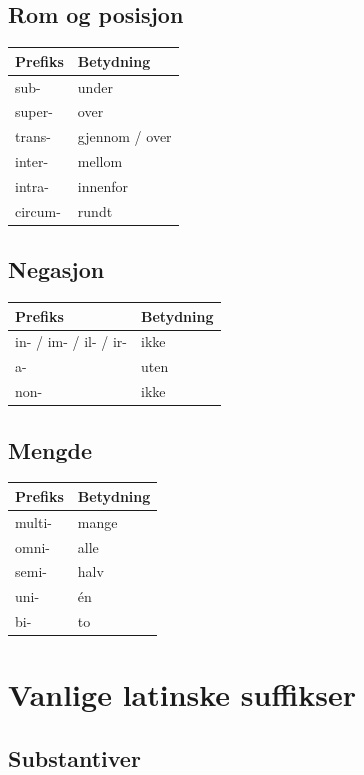 \documentclass{article}
\begin{document}
\subsection{Rom og posisjon}

\begin{tabular}{ll}
\toprule
Prefiks & Betydning \\
\midrule
sub- & under \\
super- & over \\
trans- & gjennom / over \\
inter- & mellom \\
intra- & innenfor \\
circum- & rundt \\
\bottomrule
\end{tabular}

\subsection{Negasjon}

\begin{tabular}{ll}
\toprule
Prefiks & Betydning \\
\midrule
in- / im- / il- / ir- & ikke \\
a- & uten \\
non- & ikke \\
\bottomrule
\end{tabular}

\subsection{Mengde}

\begin{tabular}{ll}
\toprule
Prefiks & Betydning \\
\midrule
multi- & mange \\
omni- & alle \\
semi- & halv \\
uni- & én \\
bi- & to \\
\bottomrule
\end{tabular}

\section{Vanlige latinske suffikser}

\subsection{Substantiver}
\end{document}
